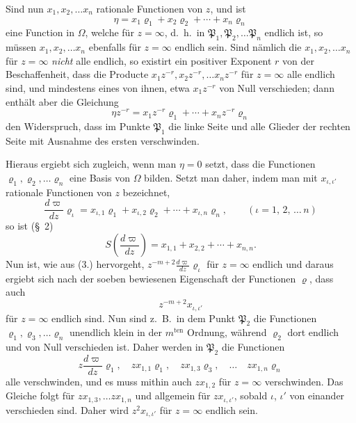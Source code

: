 \documentclass{article}
\begin{document}
Sind nun $x_{1}, x_{2}, \ldots x_{n}$ rationale Functionen von $z$, und ist
\[ \eta = x_{1}\varrho_{1}+x_{2}\varrho_{2}+\cdots+x_{n}\varrho_{n} \]
eine Function in $\Omega$, welche für $z = \infty$, d.\ h.\ in $\mathfrak{P}_{1}, \mathfrak{P}_{2}, \ldots \mathfrak{P}_{n}$ endlich ist, so müssen $x_{1}, x_{2}, \ldots x_{n}$ ebenfalls für $z = \infty$ endlich sein. Sind nämlich die $x_{1}, x_{2}, \ldots x_{n}$ für $z = \infty$ \emph{nicht} alle endlich, so existirt ein positiver Exponent $r$ von der Beschaffenheit, dass die Producte $x_{1}z^{-r}, x_{2}z^{-r}, \ldots x_{n}z^{-r}$ für $z = \infty$ alle endlich sind, und mindestens eines von ihnen, etwa $x_{1}z^{-r}$ von Null verschieden; dann enthält aber die Gleichung
\[ \eta z^{-r} = x_{1}z^{-r}\varrho_{1}+\cdots+x_{n}z^{-r}\varrho_{n} \]
den Widerspruch, dass im Punkte $\mathfrak{P}_{1}$ die linke Seite und alle Glieder der rechten Seite mit Ausnahme des ersten verschwinden.


Hieraus ergiebt sich zugleich, wenn man $\eta = 0$ setzt, dass die Functionen $\varrho_{1}, \varrho_{2}, \ldots \varrho_{n}$ eine Basis von $\Omega$ bilden. Setzt man daher, indem man mit $x_{\iota,\iota'}$ rationale Functionen von $z$ bezeichnet,
\[ \frac{d\varpi}{dz}\varrho_{\iota} = x_{\iota,1}\varrho_{1}+x_{\iota,2}\varrho_{2}+\cdots+x_{\iota,n}\varrho_{n}, \qquad {\scriptstyle (\iota = 1,\, 2,\, \ldots\, n)} \tag{4.} \]
so ist (§~2)
\[ S\left(\frac{d\varpi}{dz}\right) = x_{1,1}+x_{2,2}+\cdots+x_{n,n}. \tag{5.} \]
Nun ist, wie aus (3.) hervorgeht, $z^{-m+2}\frac{d\varpi}{dz}\varrho_{\iota}$ für $z = \infty$ endlich und daraus ergiebt sich nach der soeben bewiesenen Eigenschaft der Functionen $\varrho$, dass auch
\[ z^{-m+2}x_{\iota,\iota'} \]
für $z = \infty$ endlich sind. Nun sind z.\ B.\ in dem Punkt $\mathfrak{P}_{2}$ die Functionen $\varrho_{1}, \varrho_{3}, \ldots \varrho_{n}$ unendlich klein in der $m^{\text{ten}}$ Ordnung, während $\varrho_{2}$ dort endlich und von Null verschieden ist. Daher werden in $\mathfrak{P}_{2}$ die Functionen
\[ z\frac{d\varpi}{dz}\varrho_{1}, \quad zx_{1,1}\varrho_{1}, \quad zx_{1,3}\varrho_{3}, \quad \ldots \quad zx_{1,n}\varrho_{n} \]
alle verschwinden, und es muss mithin auch $zx_{1,2}$ für $z = \infty$ verschwinden. Das Gleiche folgt für $zx_{1,3}, \ldots zx_{1,n}$ und allgemein für $zx_{\iota,\iota'}$, sobald $\iota$, $\iota'$ von einander verschieden sind. Daher wird $z^{2}x_{\iota,\iota'}$ für $z = \infty$ endlich sein.
\end{document}
